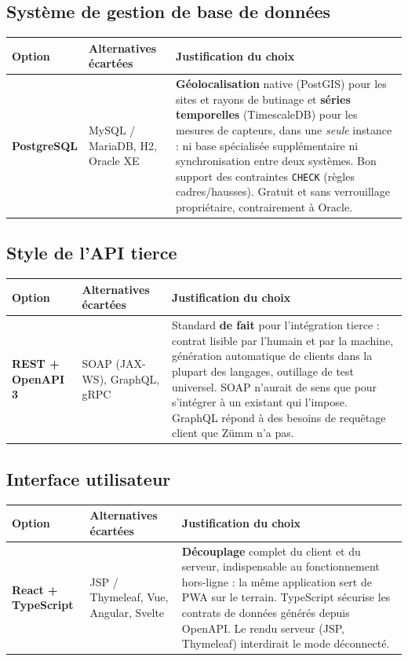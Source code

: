 \subsection{Système de gestion de base de données}
\begin{xltabular}{\textwidth}{>{\bfseries}p{2.7cm} p{4.2cm} X}
\toprule
\textbf{Option} & \textbf{Alternatives écartées} & \textbf{Justification du choix} \\
\midrule
\endhead
PostgreSQL & MySQL / MariaDB, H2, Oracle XE & \textbf{Géolocalisation} native (PostGIS) pour les sites et rayons de butinage et \textbf{séries temporelles} (TimescaleDB) pour les mesures de capteurs, dans une \emph{seule} instance : ni base spécialisée supplémentaire ni synchronisation entre deux systèmes. Bon support des contraintes \texttt{CHECK} (règles cadres/hausses). Gratuit et sans verrouillage propriétaire, contrairement à Oracle. \\
\bottomrule
\end{xltabular}

\subsection{Style de l'API tierce}
\begin{xltabular}{\textwidth}{>{\bfseries}p{2.7cm} p{4.2cm} X}
\toprule
\textbf{Option} & \textbf{Alternatives écartées} & \textbf{Justification du choix} \\
\midrule
\endhead
REST + OpenAPI 3 & SOAP (JAX-WS), GraphQL, gRPC & Standard \textbf{de fait} pour l'intégration tierce : contrat lisible par l'humain et par la machine, génération automatique de clients dans la plupart des langages, outillage de test universel. SOAP n'aurait de sens que pour s'intégrer à un existant qui l'impose. GraphQL répond à des besoins de requêtage client que Zümm n'a pas. \\
\bottomrule
\end{xltabular}

\subsection{Interface utilisateur}
\begin{xltabular}{\textwidth}{>{\bfseries}p{2.7cm} p{4.2cm} X}
\toprule
\textbf{Option} & \textbf{Alternatives écartées} & \textbf{Justification du choix} \\
\midrule
\endhead
React + TypeScript & JSP / Thymeleaf, Vue, Angular, Svelte & \textbf{Découplage} complet du client et du serveur, indispensable au fonctionnement hors-ligne : la même application sert de PWA sur le terrain. TypeScript sécurise les contrats de données générés depuis OpenAPI. Le rendu serveur (JSP, Thymeleaf) interdirait le mode déconnecté. \\
\bottomrule
\end{xltabular}

